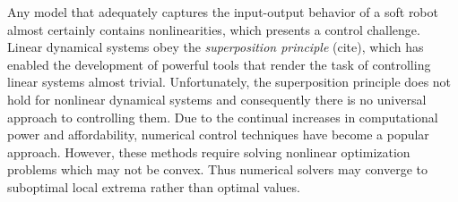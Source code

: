 Any model that adequately captures the input-output behavior of a soft robot almost certainly contains nonlinearities, which presents a control challenge.
Linear dynamical systems obey the \emph{superposition principle} (cite), which has enabled the development of powerful tools that render the task of controlling linear systems almost trivial.
Unfortunately, the superposition principle does not hold for nonlinear dynamical systems and consequently there is no universal approach to controlling them.
Due to the continual increases in computational power and affordability, numerical control techniques have become a popular approach.
However, these methods require solving nonlinear optimization problems which may not be convex.
Thus numerical solvers may converge to suboptimal local extrema rather than optimal values.



